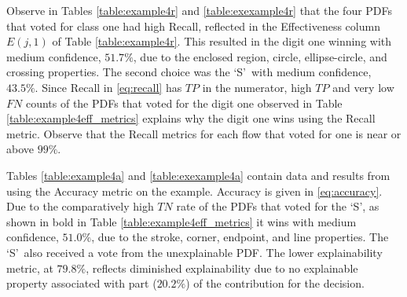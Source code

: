 \begin{table}[H]
    \renewcommand{\arraystretch}{1.3}
     \label{table:exexample4r}
    \begin{center}
    \end{center}
\end{table}

Observe in Tables \ref{table:example4r} and \ref{table:exexample4r} that the
four PDFs that voted for class one had high Recall, reflected in the
Effectiveness column $E(j,1)$ of Table \ref{table:example4r}.  This resulted in
the digit one winning with medium confidence, $51.7\%$, due to the enclosed
region, circle, ellipse-circle, and crossing properties.  The second choice was
the \lq{S}\rq~with medium confidence, $43.5\%$. Since Recall in
\eqref{eq:recall} has $TP$ in the numerator, high $TP$ and very low $FN$ counts
of the PDFs that voted for the digit one observed in Table
\ref{table:example4eff_metrics} explains why the digit one wins using the Recall
metric. Observe that the Recall metrics for each flow that voted for one is near
or above $99\%$.

Tables \ref{table:example4a} and \ref{table:exexample4a} contain data and
results from using the Accuracy metric on the example.  Accuracy is given in
\eqref{eq:accuracy}.  Due to the comparatively high $TN$ rate of the PDFs that
voted for the \lq{S}\rq, as shown in bold in Table
\ref{table:example4eff_metrics} it wins with medium confidence, $51.0\%$, due to
the stroke, corner, endpoint, and line properties. The \lq{S}\rq~also received a
vote from the unexplainable PDF.  The lower explainability metric, at $79.8\%$,
reflects diminished explainability due to no explainable property associated
with part ($20.2\%$) of the contribution for the decision.

